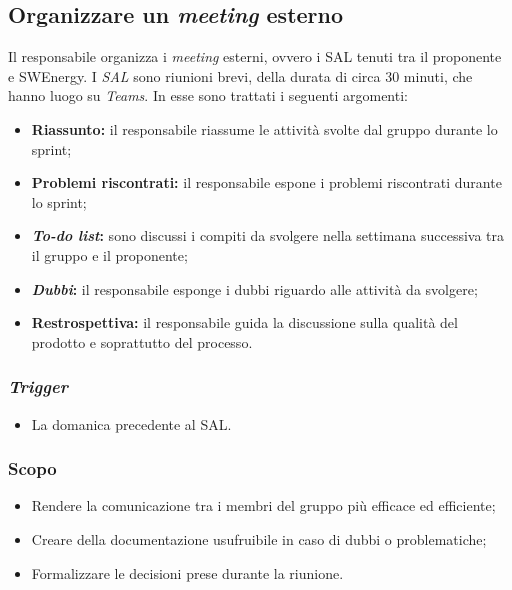 \subsection{Organizzare un \textit{meeting} esterno}
\label{organizzare-meeting-esterno}

Il responsabile organizza i \textit{meeting} esterni, ovvero i SAL
tenuti tra il proponente e SWEnergy.
I \textit{SAL} sono riunioni brevi, della durata di circa 30 minuti, che hanno
luogo su \textit{Teams}. In esse
sono trattati i seguenti argomenti:
\begin{itemize}
	\item \textbf{Riassunto:} il responsabile riassume le attività svolte dal
	      gruppo durante lo sprint;

	\item \textbf{Problemi riscontrati:} il responsabile espone i problemi
	      riscontrati durante lo sprint;

	\item \textbf{\textit{To-do list}:} sono discussi i compiti da svolgere nella
	      settimana successiva tra il gruppo e il proponente;

	\item \textbf{\textit{Dubbi}:} il responsabile esponge i dubbi riguardo alle
	      attività da svolgere;

	\item \textbf{Restrospettiva:} il responsabile guida la discussione sulla
	      qualità del prodotto e soprattutto del processo.
\end{itemize}

\subsubsection{\textit{Trigger}}
\begin{itemize}
	\item La domanica precedente al SAL.
\end{itemize}

\subsubsection{Scopo}
\begin{itemize}
	\item Rendere la comunicazione tra i membri del gruppo più efficace ed
	      efficiente;

	\item Creare della documentazione usufruibile in caso di dubbi o
	      problematiche;

	\item Formalizzare le decisioni prese durante la riunione.
\end{itemize}

